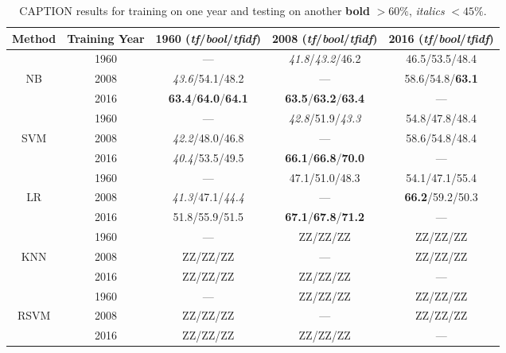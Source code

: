 \documentclass[aps, prl, reprint, showpacs]{revtex4-1}
\begin{document}
\begin{table*} %
  \begin{ruledtabular}
  \begin{tabular}{ccccc}
   Method & Training Year & 1960 (\textit{tf}/\textit{bool}/\textit{tfidf}) & 2008 (\textit{tf}/\textit{bool}/\textit{tfidf}) & 2016 (\textit{tf}/\textit{bool}/\textit{tfidf}) \\
    \hline
 & 1960 & ---  & \textit{41.8}/\textit{43.2}/46.2 & 46.5/53.5/48.4 \\
NB & 2008 & \textit{43.6}/54.1/48.2  & --- & 58.6/54.8/\textbf{63.1} \\
 & 2016 & \textbf{63.4}/\textbf{64.0}/\textbf{64.1}  & \textbf{63.5}/\textbf{63.2}/\textbf{63.4} & --- \\
 \hline
  & 1960 & ---  & \textit{42.8}/51.9/\textit{43.3} & 54.8/47.8/48.4 \\
SVM & 2008 & \textit{42.2}/48.0/46.8  & --- & 58.6/54.8/48.4 \\
 & 2016 & \textit{40.4}/53.5/49.5  & \textbf{66.1}/\textbf{66.8}/\textbf{70.0} & --- \\
 \hline
  & 1960 & ---  & 47.1/51.0/48.3 & 54.1/47.1/55.4 \\
LR & 2008 & \textit{41.3}/47.1/\textit{44.4}  & --- & \textbf{66.2}/59.2/50.3 \\
 & 2016 & 51.8/55.9/51.5  & \textbf{67.1}/\textbf{67.8}/\textbf{71.2} & --- \\
 \hline
  & 1960 & ---  & ZZ/ZZ/ZZ & ZZ/ZZ/ZZ \\
KNN & 2008 & ZZ/ZZ/ZZ  & --- & ZZ/ZZ/ZZ \\
 & 2016 & ZZ/ZZ/ZZ  & ZZ/ZZ/ZZ & --- \\
 \hline
  & 1960 & ---  & ZZ/ZZ/ZZ & ZZ/ZZ/ZZ \\
RSVM & 2008 & ZZ/ZZ/ZZ  & --- & ZZ/ZZ/ZZ \\
 & 2016 & ZZ/ZZ/ZZ  & ZZ/ZZ/ZZ & --- \\
 \hline
  \end{tabular}
  \end{ruledtabular}
    \caption{CAPTION results for training on one year and testing on another \textbf{bold} $> 60\%$, \textit{italics} $< 45\%$.}
     \label{tab:results}
\end{table*}
\end{document}
